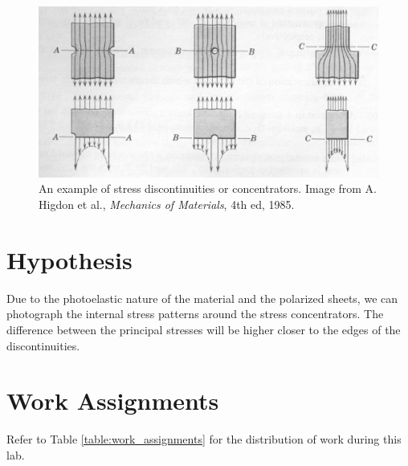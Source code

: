 \documentclass[12 pt]{article}
\begin{document}
\begin{figure}[htbp]
\centering
\includegraphics[width=6in]{images/Stress_Concentrators}
\caption{An example of stress discontinuities or concentrators. Image from A. Higdon et al., \textit{Mechanics of Materials}, 4th ed, 1985.}
\label{fig:stress_concentrators}
\end{figure}

\section{Hypothesis} \label{hypothesis}
Due to the photoelastic nature of the material and the polarized sheets, we can photograph the internal stress patterns around the stress concentrators. The difference between the principal stresses will be higher closer to the edges of the discontinuities.

\section{Work Assignments} \label{work_assignments}
Refer to Table \ref{table:work_assignments} for the distribution of work during this lab.
\end{document}
